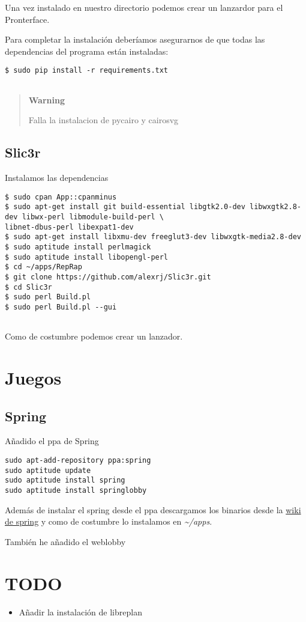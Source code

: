 Una vez instalado en nuestro directorio podemos crear un lanzardor para
el Pronterface.

Para completar la instalación deberíamos asegurarnos de que todas las
dependencias del programa están instaladas:

\begin{verbatim}
$ sudo pip install -r requirements.txt
      
\end{verbatim}

\begin{quote}
\textbf{Warning}

Falla la instalacion de pycairo y cairosvg
\end{quote}

\subsection{Slic3r}\label{slic3r}

Instalamos las dependencias

\begin{verbatim}
$ sudo cpan App::cpanminus
$ sudo apt-get install git build-essential libgtk2.0-dev libwxgtk2.8-dev libwx-perl libmodule-build-perl \
libnet-dbus-perl libexpat1-dev
$ sudo apt-get install libxmu-dev freeglut3-dev libwxgtk-media2.8-dev
$ sudo aptitude install perlmagick
$ sudo aptitude install libopengl-perl
$ cd ~/apps/RepRap
$ git clone https://github.com/alexrj/Slic3r.git
$ cd Slic3r
$ sudo perl Build.pl
$ sudo perl Build.pl --gui
      
\end{verbatim}

Como de costumbre podemos crear un lanzador.

\section{Juegos}\label{juegos}

\subsection{Spring}\label{spring}

Añadido el ppa de Spring

\begin{verbatim}
sudo apt-add-repository ppa:spring
sudo aptitude update
sudo aptitude install spring
sudo aptitude install springlobby
\end{verbatim}

Además de instalar el spring desde el ppa descargamos los binarios desde
la \href{https://springrts.com/wiki/Download}{wiki de spring} y como de
costumbre lo instalamos en \emph{\textasciitilde{}/apps}.

También he añadido el weblobby

\section{TODO}\label{todo}

\begin{itemize}
\itemsep1pt\parskip0pt
\item
  Añadir la instalación de libreplan
\end{itemize}
